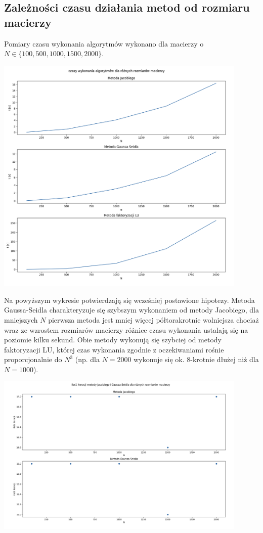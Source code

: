 \documentclass{article}
\begin{document}
\subsection{Zależności czasu działania metod od rozmiaru macierzy}
Pomiary czasu wykonania algorytmów wykonano dla macierzy o $N \in \{100,500, 1000, 1500, 2000\}$.
\begin{center}
	\includegraphics[width=12cm]{z5_czasy}
\end{center}
Na powyższym wykresie potwierdzają się wcześniej postawione hipotezy. Metoda Gaussa-Seidla
charakteryzuje się szybszym wykonaniem od metody Jacobiego,  dla mniejszych $N$ pierwsza metoda
jest mniej więcej półtorakrotnie wolniejsza chociaż wraz ze wzrostem rozmiarów macierzy różnice
czasu wykonania ustalają się na poziomie kilku sekund. Obie metody wykonują się szybciej
od metody faktoryzacji LU, której czas wykonania 
zgodnie z oczekiwaniami rośnie proporcjonalnie do $N^3$ 
(np. dla $N=2000$ wykonuje się ok. 8-krotnie dłużej niż dla $N=1000$).
\begin{center}
	\includegraphics[width=12cm]{z5_iteracje}
\end{center}
\end{document}
